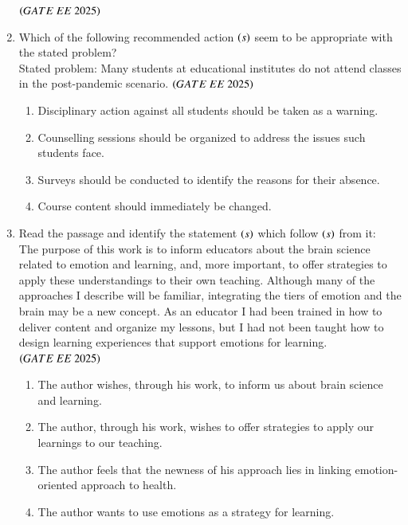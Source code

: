 \documentclass[journal,12pt,onecolumn]{IEEEtran}
\theoremstyle{remark}
\begin{document}
\begin{enumerate}
\hfill $\brak{GATE\ EE\ 2025}$
    \begin{enumerate}
      \end{enumerate}

  \item Which of the following recommended action $\left(s\right)$ seem to be appropriate with the stated problem?  \\  
      Stated problem: Many students at educational institutes do not attend classes in the post-pandemic scenario.  
     \hfill $\brak{GATE\ EE\ 2025}$
    \begin{enumerate}
    
  \item Disciplinary action against all students should be taken as a warning.   
  \item Counselling sessions should be organized to address the issues such students face.
  \item Surveys should be conducted to identify the reasons for their absence.
  \item Course content should immediately be changed.
   \end{enumerate}

   \item Read the passage and identify the statement $\left(s\right)$ which follow $\left(s\right)$ from it: \\    
      The purpose of this work is to inform educators about the brain science related to emotion and learning, and, more important, to offer strategies to apply these understandings to their own teaching. Although many of the approaches I describe will be familiar, integrating the tiers of emotion and the brain may be a new concept. As an educator I had been trained in how to deliver content and organize my lessons, but I had not been taught how to design learning experiences that support emotions for learning.       
     \hfill $\brak{GATE\ EE\ 2025}$
    \begin{enumerate}
    \item  The author wishes, through his work, to inform us about brain science and learning.    
  \item The author, through his work, wishes to offer strategies to apply our learnings to our teaching.    
  \item The author feels that the newness of his approach lies in linking emotion-oriented approach to health.   
  \item The author wants to use emotions as a strategy for learning.   
   \end{enumerate}


\end{enumerate}
\end{document}
